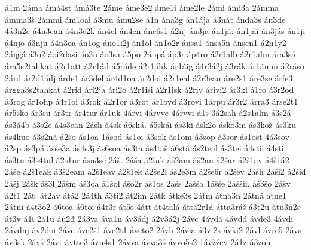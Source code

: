 {    á1m
    2áma
    ámá4st
    ámá3te
    2áme
    áme3e2
    áme1i
    áme2le
    2ámi
    ámi3a
    2ámma
    ámma3š
    2ámmi
    ám1oai
    á3mu
    ámu2se
    á1n
    ána3g
    án1ája
    á3nát
    ánda3s
    án3de
    4á3n2e
    á4n3ean
    á4n3e2k
    án4el
    án4en
    áne6s1
    á2nj
    án3ja
    án1já.
    án1jái
    án3jás
    án1ji
    á4njo
    á3nju
    á4n3oa
    án1og
    áno1i2j
    án1ol
    án1o2r
    ánsa1
    ánsa5n
    ánsen1
    á2n1y2
    2áŋgá
    á3o2
    áoi2dasi
    áo3n
    áo3sa
    á5po
    2áppá
    áp3r
    áp4ro
    á2r1alb
    á2r1alm
    ára3sá
    ára5s2tahkat
    á2r1att
    á2r1ád
    á5ráde
    á2r1áhk
    ár1áig
    á4r3á2j
    á3rák
    ár1ámm
    á2ráso
    2árd
    ár2d1ádj
    árde1
    ár3del
    ár4d1oa
    ár2doi
    á2r1eal
    á2r3ean
    áre2s1
    áre3se
    árfe3
    árgga3s2tahkat
    á2rid
    ári2ja
    ári2o
    á2r1isi
    á2r1isk
    á2riv
    árivi2
    ár3kl
    á1ro
    á3r2od
    á3rog
    ár1ohp
    á4r1oi
    á3rok
    á2r1or
    á3rot
    ár1ovd
    á3rovi
    1árpu
    ár3r2
    árra3
    árse2t1
    ár5sko
    ár3su
    ár3tr
    ár4tur
    ár1uk
    4árvi
    4árvve
    4árvvi
    á1s
    3á2sah
    á2s1alm
    á3s2á
    ás3á4b
    á3s2e
    á4s3ean
    2ásh
    á4sk
    á6ská.
    á5skái
    ás3ki
    ásk2o
    ásko3m
    ás3kož
    ás3ku
    ás4kuo
    á3s2ná
    á2so
    ás1oa
    1ásod
    ás1oi
    á3sok
    ás1om
    á3sop
    á3sor
    ás1ost
    4á3sov
    á2sp
    ás3pá
    ásse3a
    ás4s3j
    ás6soa
    ás3ta
    ás4taš
    á6stá
    ás2teal
    ás3tei
    á4stii
    á4stit
    ás3tu
    á3s4tul
    á2s1ur
    ásu3se
    2áš.
    2áša
    á2šak
    áš2am
    áš2an
    á2šar
    á2š1av
    á4š1á2
    2áše
    á2š1eak
    á3š2eam
    á2š1eav
    á2š1ek
    á2še2l
    áš2e3m
    á2še6r
    á2šev
    2ášh
    2áši2
    á2šid
    2ášj
    2ášk
    áš3l
    2ášm
    áš3oa
    á1šol
    ášo2r
    áš1os
    2ášs
    2ášša
    1ášše
    2áššii.
    áš3šo
    2ášv
    á2t1
    2át.
    át2av
    átá2
    2á4th
    á3ti2
    át2im
    2átk
    átke3s
    2átm
    átna3n
    2átná
    átne1
    2átni
    á4t3o2
    á6toa
    á6toi
    á4t3r
    át5s
    4átt
    át4talá
    átta2r1á
    átta3ráš
    á3t2u
    átu3n2e
    át3v
    á1ŧ
    2á1u
    áu2đ
    2á3va
    áva1n
    áv3ádj
    á2v3á2j
    2ávc
    4ávdá
    4ávdd
    ávde3
    4ávdi
    2ávdnj
    áv2doi
    2áve
    áve2š1
    áve2t1
    áveto2
    2ávh
    2ávia
    á3vi2s
    ávki2
    2ávl
    ávre5
    2ávs
    áv3sk
    2ávš
    2ávt
    ávtte3
    ávu4s1
    2ávva
    ávva3š
    ávvo5s2
    1ávžžev
    2á1z
    á3zoh
}
